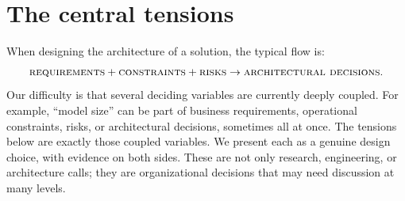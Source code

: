 \section{The central tensions}
\label{section:tensions}

\begin{summarybox}
    When designing the architecture of a solution, the typical flow is:
    \[
    \textsc{requirements} + \textsc{constraints} + \textsc{risks}
    \rightarrow
    \textsc{architectural decisions}.
    \]
    Our difficulty is that several deciding variables are currently deeply coupled. For example, ``model size'' can be part of business requirements, operational constraints, risks, or architectural decisions, sometimes all at once.
    The tensions below are exactly those coupled variables. We present each as a genuine design choice, with evidence on both sides. These are not only research, engineering, or architecture calls; they are organizational decisions that may need discussion at many levels. %
\end{summarybox}


